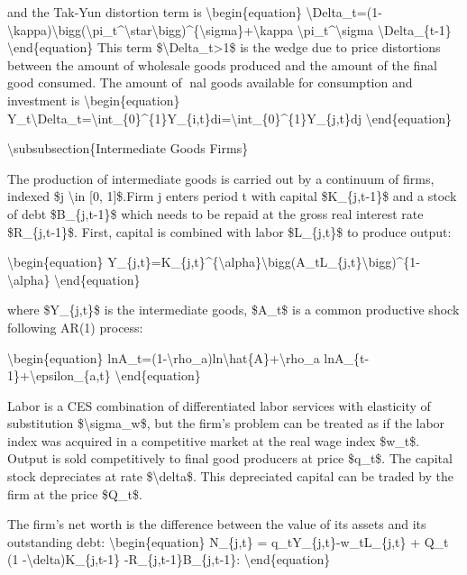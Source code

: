 \documentclass[10pt,math=newtx,citestyle=gb7714-2015,bibstyle=gb7714-2015]{elegantbook}
\begin{document}
	and the Tak-Yun distortion term is
	\textbackslash{}begin\{equation\}
	\textbackslash{}Delta\_t=(1-\textbackslash{}kappa)\textbackslash{}bigg(\textbackslash{}pi\_t\^{}\textbackslash{}star\textbackslash{}bigg)\^{}\{\textbackslash{}sigma\}+\textbackslash{}kappa \textbackslash{}pi\_t\^{}\textbackslash{}sigma \textbackslash{}Delta\_\{t-1\}
	\textbackslash{}end\{equation\}
	This term \$\textbackslash{}Delta\_t>1\$ is the wedge due to price distortions between the amount of wholesale goods produced and the amount of the final good consumed. The amount of nal goods available for consumption and investment is
	\textbackslash{}begin\{equation\}
	Y\_t\textbackslash{}Delta\_t=\textbackslash{}int\_\{0\}\^{}\{1\}Y\_\{i,t\}di=\textbackslash{}int\_\{0\}\^{}\{1\}Y\_\{j,t\}dj
	\textbackslash{}end\{equation\}
	
	
	\textbackslash{}subsubsection\{Intermediate Goods Firms\}
	
	The production of intermediate goods is carried out by a continuum of firms, indexed \$j \textbackslash{}in [0, 1]\$.Firm j enters period t with capital \$K\_\{j,t-1\}\$ and a stock of debt \$B\_\{j,t-1\}\$ which needs to be repaid at the gross real interest rate \$R\_\{j,t-1\}\$. First, capital is combined with labor \$L\_\{j,t\}\$ to produce output:
	
	\textbackslash{}begin\{equation\}
	Y\_\{j,t\}=K\_\{j,t\}\^{}\{\textbackslash{}alpha\}\textbackslash{}bigg(A\_tL\_\{j,t\}\textbackslash{}bigg)\^{}\{1-\textbackslash{}alpha\}
	\textbackslash{}end\{equation\}
	
	where \$Y\_\{j,t\}\$ is the intermediate goods, \$A\_t\$ is a common productive shock following AR(1) process:
	
	\textbackslash{}begin\{equation\}
	lnA\_t=(1-\textbackslash{}rho\_a)ln\textbackslash{}hat\{A\}+\textbackslash{}rho\_a lnA\_\{t-1\}+\textbackslash{}epsilon\_\{a,t\}
	\textbackslash{}end\{equation\}
	
	Labor is a CES combination of differentiated labor services with elasticity of substitution \$\textbackslash{}sigma\_w\$, but the firm's problem can be treated as if the labor index was acquired in a competitive market at the real wage index \$w\_t\$. Output is sold competitively to final good producers at price \$q\_t\$. The capital stock depreciates at rate \$\textbackslash{}delta\$. This depreciated capital can be traded by the firm at the price \$Q\_t\$.
	
	The firm's net worth is the difference between the value of its assets and its outstanding debt:
	\textbackslash{}begin\{equation\}
	N\_\{j,t\} = q\_tY\_\{j,t\}-w\_tL\_\{j,t\} + Q\_t (1 -\textbackslash{}delta)K\_\{j,t-1\} -R\_\{j,t-1\}B\_\{j,t-1\}:
	\textbackslash{}end\{equation\}
	
\end{document}
